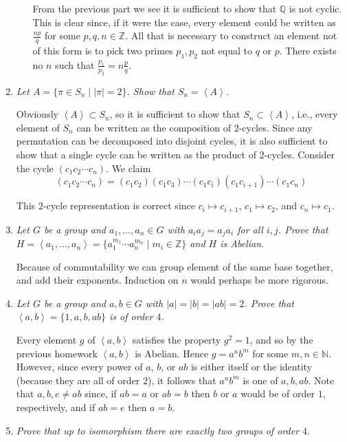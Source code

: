 \documentclass[letterpaper, 11pt]{article}
\newcommand{\brac}[1]{
\left\langle #1 \right\rangle
}
\begin{document}
\begin{enumerate}
\begin{enumerate}
From the previous part we see it is sufficient to show that $\mathbb{Q}$ is not cyclic.  This is clear since, if it were the case, every element could be written as $\frac{np}{q}$ for some $p,q,n \in \mathbb{Z}$.  All that is necessary to construct an element not of this form is to pick two primes $p_1, p_2$ not equal to $q$ or $p$.  There exists no $n$ such that $\frac{p_1}{p_2} = n\frac{p}{q}$.

\end{enumerate}

\item \emph{Let $A = \{ \pi \in S_n \mid |\pi| = 2\}$.  Show that $S_n = \brac{A}$.}

Obviously $\brac{A} \subset S_n$, so it is sufficient to show that $S_n \subset \brac{A}$, i.e., every element of $S_n$ can be written as the composition of $2$-cycles.  Since any permutation can be decomposed into disjoint cycles, it is also sufficient to show that a single cycle can be written as the product of $2$-cycles.  Consider the cycle $(c_1c_2 \cdots c_n)$.  We claim
\[
(c_1c_2 \cdots c_n) = (c_1c_2)(c_1c_3)\cdots(c_1c_i)(c_1c_{i+1})\cdots(c_1c_n)
\]

This $2$-cycle representation is correct since $c_i \mapsto c_{i+1}$, $c_1 \mapsto c_2$, and $c_n \mapsto c_1$.

\item \emph{Let $G$ be a group and $a_1, \ldots, a_n \in G$ with $a_ia_j = a_ja_i$ for all $i,j$.  Prove that $H = \brac{a_1, \ldots, a_n} = \{a_1^{m_1} \cdots a_n^{m_n} \mid m_i \in \mathbb{Z}\}$ and $H$ is Abelian.}

Because of commutability we can group element of the same base together, and add their exponents.  Induction on $n$ would perhaps be more rigorous.

\item \emph{Let $G$ be a group and $a,b \in G$ with $|a| = |b| = |ab| = 2$.  Prove that $\brac{a,b} = \{1,a,b,ab\}$ is of order $4$.}

Every element $g$ of $\brac{a,b}$ satisfies the property $g^2 =1$, and so by the previous homework $\brac{a,b}$ is Abelian.  Hence $g = a^nb^m$ for some $m,n \in \mathbb{N}$.  However, since every power of $a$, $b$, or $ab$ is either itself or the identity (because they are all of order $2$), it follows that $a^nb^m$ is one of $a,b, ab$.  Note that $a,b,e \neq ab$ since, if $ab = a$ or $ab = b$ then $b$ or $a$ would be of order $1$, respectively, and if $ab = e$ then $a=b$.

\item \emph{Prove that up to isomorphism there are exactly two groups of order $4$.}


\end{enumerate}
\end{document}
